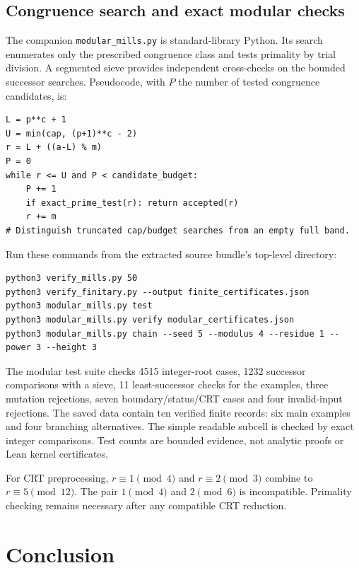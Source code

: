 \documentclass[11pt,reqno]{amsart}
\theoremstyle{blueplain}
\numberwithin{equation}{section}
\def\hyperlink#1#2{#2}}
\begin{document}
\subsection{Congruence search and exact modular checks}\label{sec:mod-scripts}
\hypertarget{term:CLI}{}
The companion \texttt{modular\_mills.py} is standard-library Python. Its
search enumerates only the prescribed congruence class and tests primality
by trial division. A segmented sieve provides independent cross-checks
on the bounded successor searches. Pseudocode, with \(P\) the number
of tested congruence candidates, is:
\begin{lstlisting}[style=python,basicstyle=\ttfamily\scriptsize,numberstyle=\scriptsize]
L = p**c + 1
U = min(cap, (p+1)**c - 2)
r = L + ((a-L) % m)
P = 0
while r <= U and P < candidate_budget:
    P += 1
    if exact_prime_test(r): return accepted(r)
    r += m
# Distinguish truncated cap/budget searches from an empty full band.
\end{lstlisting}
Run these commands from the extracted source bundle's top-level directory:
\begin{lstlisting}[style=python,basicstyle=\ttfamily\scriptsize,numberstyle=\scriptsize]
python3 verify_mills.py 50
python3 verify_finitary.py --output finite_certificates.json
python3 modular_mills.py test
python3 modular_mills.py verify modular_certificates.json
python3 modular_mills.py chain --seed 5 --modulus 4 --residue 1 --power 3 --height 3
\end{lstlisting}
The modular test suite checks 4515 integer-root cases, 1232 successor
comparisons with a sieve, 11 least-successor checks for the examples,
three mutation rejections, seven boundary/status/\hyperlink{term:CRT}{CRT} cases and four
invalid-input rejections. The saved data contain ten verified finite
records: six main examples and four branching alternatives. The simple
readable subcell is checked by exact integer comparisons. Test counts
are bounded evidence, not analytic proofs or Lean kernel certificates.

For \hyperlink{term:CRT}{CRT} preprocessing, \(r\equiv1\pmod4\) and \(r\equiv2\pmod3\)
combine to \(r\equiv5\pmod{12}\). The pair \(1\pmod4\) and
\(2\pmod6\) is incompatible. Primality checking remains necessary
after any compatible \hyperlink{term:CRT}{CRT} reduction.
\section{Conclusion}\label{sec:conclusion}
\end{document}
